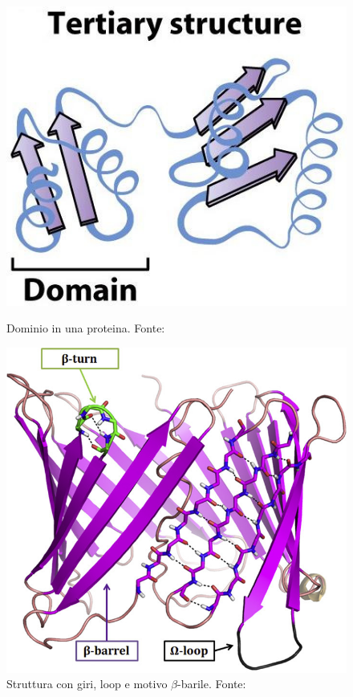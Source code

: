 {{\begin{figure}[!htb]
	\centering
	\includegraphics[scale=0.4]{images/dominio.jpg}
	\caption{Dominio in una proteina. Fonte: \cite{moran2012principles}}
	\label{fig:domini}
	\endminipage\hfill
	\centering
	\includegraphics[scale=1]{images/turn-loop.jpg}
	\caption{Struttura con giri, loop e motivo $\beta$-barile. Fonte: \cite{MURRAY2017477}}
	\label{fig:turn-loops}
	\endminipage\hfill
\end{figure}

}}
